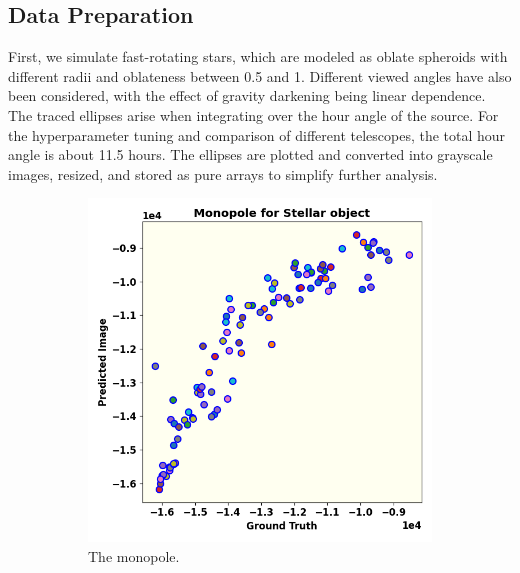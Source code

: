 \subsection{Data Preparation}
First, we simulate fast-rotating stars, which are modeled as oblate spheroids with different radii and oblateness between 0.5 and 1. Different viewed angles have also been considered, with the effect of gravity darkening being linear dependence. The traced ellipses arise when integrating over the hour angle of the source. For the hyperparameter tuning and comparison of different telescopes, the total hour angle is about 11.5 hours. The ellipses are plotted and converted into grayscale images, resized, and stored as pure arrays to simplify further analysis. 
\begin{figure}
	\centering
	\begin{subfigure}{0.33\linewidth}
		\includegraphics[width=\linewidth]{fig/moments/mom0.png}
		\caption{The monopole.}
		\label{fig:mom1}
	\end{subfigure}\hfill
	\begin{subfigure}{0.33\linewidth}

\end{subfigure}
\end{figure}
